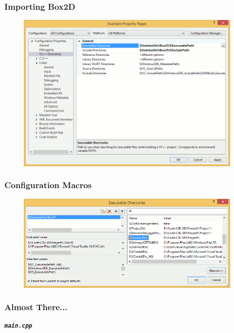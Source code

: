 \documentclass[glossy]{beamer}
\newcommand{\filename}[1]{\texttt{\textbf{\emph{#1}}}}
\begin{document}

\begin{frame}[fragile=singleslide]
  \frametitle{Importing Box2D}
  \begin{figure}
    \centering
    \includegraphics[width=0.9\columnwidth]{windows-dir}
  \end{figure}
\end{frame}


\begin{frame}[fragile=singleslide]
  \frametitle{Configuration Macros}
  \begin{figure}
    \centering
    \includegraphics[width=0.9\columnwidth]{windows-macro}
  \end{figure}
\end{frame}


\begin{frame}[fragile=singleslide]
  \frametitle{Almost There...}
  
  \filename{main.cpp}
\end{frame}
\end{document}
